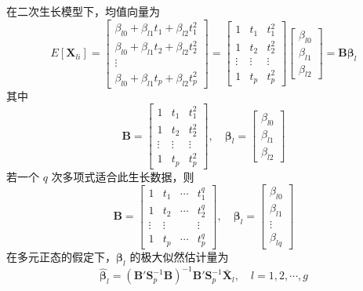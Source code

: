 在二次生长模型下，均值向量为
\[
E[\mathbf{X}_{li}]=\begin{bmatrix}\beta_{l0}+\beta_{l1}t_1+\beta_{l2}t_1^2\\ \beta_{l0}+\beta_{l1}t_2+\beta_{l2}t_2^2\\ \vdots\\ \beta_{l0}+\beta_{l1}t_p+\beta_{l2}t_p^2\end{bmatrix}
=\begin{bmatrix}1&t_1&t_1^2\\1&t_2&t_2^2\\ \vdots&\vdots&\vdots\\1&t_p&t_p^2\end{bmatrix}\begin{bmatrix}\beta_{l0}\\\beta_{l1}\\\beta_{l2}\end{bmatrix}=\mathbf{B}\boldsymbol{\beta}_l
\]
其中
\label{eq:6-76}
\begin{equation}
\mathbf{B}=\begin{bmatrix}1&t_1&t_1^2\\1&t_2&t_2^2\\ \vdots&\vdots&\vdots\\1&t_p&t_p^2\end{bmatrix},\quad
\boldsymbol{\beta}_l=\begin{bmatrix}\beta_{l0}\\\beta_{l1}\\\beta_{l2}\end{bmatrix} \tag{6-76}
\end{equation}
若一个 $q$ 次多项式适合此生长数据，则
\label{eq:6-77}
\begin{equation}
\mathbf{B}=\begin{bmatrix}1&t_1&\cdots&t_1^q\\1&t_2&\cdots&t_2^q\\ \vdots&\vdots&&\vdots\\1&t_p&\cdots&t_p^q\end{bmatrix},\quad
\boldsymbol{\beta}_l=\begin{bmatrix}\beta_{l0}\\\beta_{l1}\\\vdots\\\beta_{lq}\end{bmatrix} \tag{6-77}
\end{equation}
在多元正态的假定下，$\boldsymbol{\beta}_l$ 的极大似然估计量为
\label{eq:6-78}
\begin{equation}
\hat{\boldsymbol{\beta}}_l=(\mathbf{B}'\mathbf{S}_p^{-1}\mathbf{B})^{-1}\mathbf{B}'\mathbf{S}_p^{-1}\bar{\mathbf{X}}_l,\quad l=1,2,\cdots,g \tag{6-78}
\end{equation}
